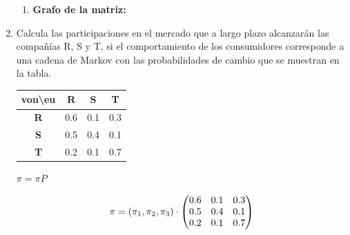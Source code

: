 \documentclass{templateNote}
\begin{document}
\begin{enumerate}
\begin{enumerate}[label=\alph*)]
        \item \textbf{Grafo de la matriz:}
    \end{enumerate}

    \newpage
    \item Calcula las participaciones en el mercado que a largo plazo alcanzarán las compañías R, S y T, si el comportamiento de los consumidores corresponde a una cadena de Markov con las probabilidades de cambio que se muestran en la tabla.
        \begin{center}
            \begin{tabular}{|c|c|c|c|}
                \hline
                von\textbackslash eu & \textbf{R} & \textbf{S} & \textbf{T} \\ \hline
                \textbf{R} & 0.6 & 0.1 & 0.3 \\
                \textbf{S} & 0.5 & 0.4 & 0.1 \\ 
                \textbf{T} & 0.2 & 0.1 & 0.7 \\ \hline
            \end{tabular}
        \end{center}
        
        $\pi = \pi P$

        \begin{equation*}
            \pi = (\pi_1, \pi_2, \pi_3)\\
            \cdot 
            \begin{pmatrix}
                0.6 & 0.1 & 0.3\\
                0.5 & 0.4 & 0.1\\
                0.2 & 0.1 & 0.7\\
            \end{pmatrix}
        \end{equation*}


\end{enumerate}
\end{document}
